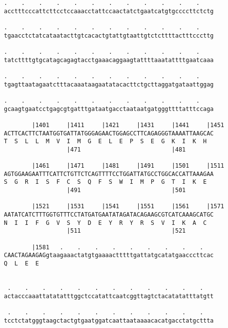 \documentclass{article}
\begin{document}
\begin{Verbatim}
.    .    .    .    .    .    .    .    .    .    .    .    
acctttcccattcttcctccaaacctattccaactatctgaatcatgtgccccttctctg
                                                            
.    .    .    .    .    .    .    .    .    .    .    .    
tgaacctctatcataatacttgtcacactgtattgtaattgtctcttttactttcccttg
                                                            
.    .    .    .    .    .    .    .    .    .    .    .    
tatcttttgtgcatagcagagtacctgaaacaggaagtattttaaatattttgaatcaaa
                                                            
.    .    .    .    .    .    .    .    .    .    .    .    
tgagttaatagaatctttacaaataagaatatacacttctgcttaggatgataattggag
                                                            
.    .    .    .    .    .    .    .    .    .    .    .    
gcaagtgaatcctgagcgtgatttgataatgacctaataatgatgggttttatttccaga
                                                            
        |1401     |1411     |1421     |1431     |1441     |1451
ACTTCACTTCTAATGGTGATTATGGGAGAACTGGAGCCTTCAGAGGGTAAAATTAAGCAC
T  S  L  L  M  V  I  M  G  E  L  E  P  S  E  G  K  I  K  H  
                  |471                          |481        
  
        |1461     |1471     |1481     |1491     |1501     |1511
AGTGGAAGAATTTCATTCTGTTCTCAGTTTTCCTGGATTATGCCTGGCACCATTAAAGAA
S  G  R  I  S  F  C  S  Q  F  S  W  I  M  P  G  T  I  K  E  
                  |491                          |501        
  
        |1521     |1531     |1541     |1551     |1561     |1571
AATATCATCTTTGGTGTTTCCTATGATGAATATAGATACAGAAGCGTCATCAAAGCATGC
N  I  I  F  G  V  S  Y  D  E  Y  R  Y  R  S  V  I  K  A  C  
                  |511                          |521        
  
        |1581   .    .    .    .    .    .    .    .    .   
CAACTAGAAGAGgtaagaaactatgtgaaaactttttgattatgcatatgaacccttcac
Q  L  E  E                                                  
                                                            
  
 .    .    .    .    .    .    .    .    .    .    .    .   
actacccaaattatatatttggctccatattcaatcggttagtctacatatatttatgtt
                                                            
 .    .    .    .    .    .    .    .    .    .    .    .   
tcctctatgggtaagctactgtgaatggatcaattaataaaacacatgacctatgcttta
                                                            

\end{Verbatim}
\end{document}
